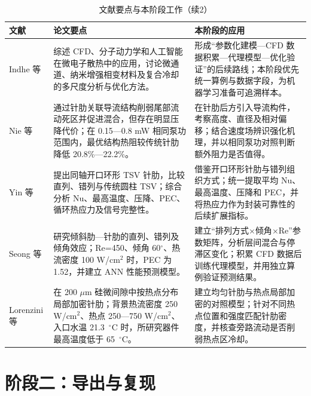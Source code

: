 \documentclass[stage1,fontset=fandol]{ydzjreport}
\begin{document}
	\begin{table}[H]
	  \centering
	  \small
	  \renewcommand{\arraystretch}{1.12}
	  \caption{文献要点与本阶段工作（续2）}
	  \label{tab:notes-cont-5}
	  \begin{tabularx}{\textwidth}{@{}>{\RaggedRight\arraybackslash}p{} Y Y@{}}
	    \toprule
	     文献 & 论文要点 & 本阶段的应用 \\
	    \midrule
	    Indhe 等\cite{ref20} & 综述 CFD、分子动力学和人工智能在微电子散热中的应用，讨论微通道、纳米增强相变材料及复合冷却的多尺度分析与优化方法。 & 形成“参数化建模—CFD 数据积累—代理模型—优化验证”的后续路线；本阶段优先统一算例与数据字段，为机器学习准备可追溯样本。 \\[3pt]
	    Nie 等\cite{ref21} & 通过针肋关联导流结构削弱尾部流动死区并促进混合，但存在明显压降代价；在 0.15—0.8 mW 相同泵功范围内，最优结构热阻较传统针肋降低 20.8\%—22.2\%。 & 在针肋后方引入导流构件，考察高度、直径及相对偏移；结合速度场辨识强化机理，并以相同泵功对照判断额外阻力是否值得。 \\[3pt]
	    Yin 等\cite{yin} & 提出同轴开口环形 TSV 针肋，比较直列、错列与传统圆柱 TSV；综合分析 Nu、最高温度、压降、PEC、循环热应力及信号完整性。 & 借鉴开口环形针肋与错列组织方式；统一提取平均 Nu、最高温度、压降和 PEC，并将热应力作为封装可靠性的后续扩展指标。 \\[3pt]
	    Seong 等\cite{seong} & 研究倾斜肋—针肋的直列、错列及倾角效应；Re=450、倾角 60$^\circ$、热流密度 100 W/cm$^2$ 时，PEC 为 1.52，并建立 ANN 性能预测模型。 & 建立“排列方式$\times$倾角$\times$Re”参数矩阵，分析层间混合与停滞区变化；积累 CFD 数据后训练代理模型，并用独立算例验证预测结果。 \\[3pt]
	    Lorenzini 等\cite{ref24} & 在 200 $\mu$m 硅微间隙中按热点分布局部加密针肋；背景热流密度 250 W/cm$^2$、热点 250—750 W/cm$^2$、入口水温 21.3 $\,{}^\circ\mathrm{C}$ 时，所研究器件最高温度低于 65 $\,{}^\circ\mathrm{C}$。 & 建立均匀针肋与热点局部加密的对照模型；针对不同热点位置和强度匹配针肋密度，并核查旁路流动是否削弱热点区冷却。 \\[3pt]
	   
	    \bottomrule
	  \end{tabularx}
	\end{table}



	\section{阶段二：导出与复现}
	
\end{document}
